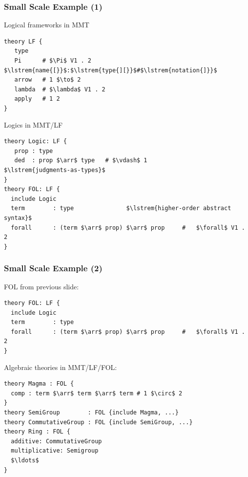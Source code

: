 \documentclass{beamer}
\begin{document}
\newcommand{\lstrem}[1]{{\color{blue}\text{#1}}}

\begin{frame}[fragile]\frametitle{Small Scale Example (1)}
Logical frameworks in MMT
\begin{lstlisting}[frame=single]
theory LF {
   type
   Pi      # $\Pi$ V1 . 2                  $\lstrem{name{[}}$:$\lstrem{type{][}}$#$\lstrem{notation{]}}$
   arrow   # 1 $\to$ 2
   lambda  # $\lambda$ V1 . 2
   apply   # 1 2
}
\end{lstlisting}

Logics in MMT/LF
\begin{lstlisting}[frame=single]
theory Logic: LF {
   prop : type
   ded  : prop $\arr$ type   # $\vdash$ 1              $\lstrem{judgments-as-types}$
}
theory FOL: LF {
  include Logic
  term        : type               $\lstrem{higher-order abstract syntax}$
  forall      : (term $\arr$ prop) $\arr$ prop     #   $\forall$ V1 . 2
}
\end{lstlisting}
\end{frame}

\begin{frame}[fragile]\frametitle{Small Scale Example (2)}
FOL from previous slide:
\begin{lstlisting}[frame=single]
theory FOL: LF {
  include Logic
  term        : type
  forall      : (term $\arr$ prop) $\arr$ prop     #   $\forall$ V1 . 2
}
\end{lstlisting}

Algebraic theories in MMT/LF/FOL:
\begin{lstlisting}[frame=single]
theory Magma : FOL {
  comp : term $\arr$ term $\arr$ term # 1 $\circ$ 2
}
theory SemiGroup        : FOL {include Magma, ...}
theory CommutativeGroup : FOL {include SemiGroup, ...}
theory Ring : FOL {
  additive: CommutativeGroup
  multiplicative: Semigroup
  $\ldots$
}
\end{lstlisting}
\end{frame}
\end{document}
